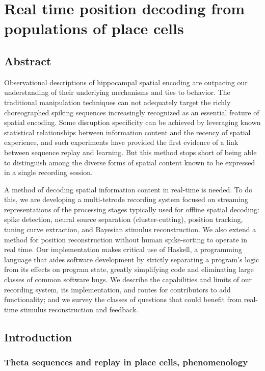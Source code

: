 \documentclass[]{article}
\let\stdsection\section
\renewcommand\section{\newpage\stdsection}
\begin{document}
\section{Real time position decoding from populations of place cells}

\subsection{Abstract}

Observational descriptions of hippocampal spatial encoding are outpacing
our understanding of their underlying mechanisms and ties to behavior.
The traditional manipulation techniques can not adequately target the
richly choreographed spiking sequences increasingly recognized as an
essential feature of spatial encoding. Some disruption specificity can
be achieved by leveraging known statistical relationships between
information content and the recency of spatial experience, and such
experiments have provided the first evidence of a link between sequence
replay and learning. But this method stops short of being able to
distinguish among the diverse forms of spatial content known to be
expressed in a single recording session.

A method of decoding spatial information content in real-time is needed.
To do this, we are developing a multi-tetrode recording system focused
on streaming representations of the processing stages typically used for
offline spatial decoding: spike detection, neural source separation
(cluster-cutting), position tracking, tuning curve extraction, and
Bayesian stimulus reconstruction. We also extend a method for position
reconstruction without human spike-sorting to operate in real time. Our
implementation makes critical use of Haskell, a programming language
that aides software development by strictly separating a program's logic
from its effects on program state, greatly simplifying code and
eliminating large classes of common software bugs. We describe the
capabilities and limits of our recording system, its implementation, and
routes for contributors to add functionality; and we survey the classes
of questions that could benefit from real-time stimulus reconstruction
and feedback.

\subsection{Introduction}

\subsubsection{Theta sequences and replay in place cells, phenomenology}
\end{document}
